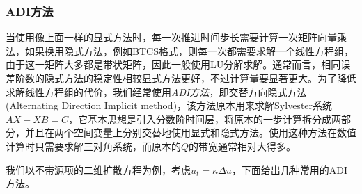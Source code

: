 \documentclass[a4paper,10pt]{ctexart}
\begin{document}
\subsubsection{ADI方法}
当使用像上面一样的显式方法时，每一次推进时间步长需要计算一次矩阵向量乘法，如果换用隐式方法，例如BTCS格式，则每一次都需要求解一个线性方程组，由于这一矩阵大多都是带状矩阵，因此一般使用LU分解求解。通常而言，相同误差阶数的隐式方法的稳定性相较显式方法更好，不过计算量要显著更大。为了降低求解线性方程组的代价，我们经常使用\emph{ADI方法}，即交替方向隐式方法(Alternating Direction Implicit method)，该方法原本用来求解Sylvester系统$ AX-XB=C $，它基本思想是引入分数阶时间层，将原本的一步计算拆分成两部分，并且在两个空间变量上分别交替地使用显式和隐式方法。使用这种方法在数值计算时只需要求解三对角系统，而原本的$ Q $的带宽通常相对大得多。

我们以不带源项的二维扩散方程为例，考虑$ u_t = \kappa \Delta u $，下面给出几种常用的ADI方法。
\end{document}
